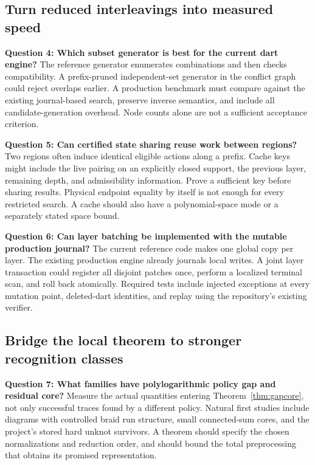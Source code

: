 \documentclass[11pt]{article}
\theoremstyle{definition}
\begin{document}
\subsection{Turn reduced interleavings into measured speed}

\textbf{Question 4: Which subset generator is best for the current dart
engine?} The reference generator enumerates combinations and then checks
compatibility. A prefix-pruned independent-set generator in the conflict
graph could reject overlaps earlier. A production benchmark must compare
against the existing journal-based search, preserve inverse semantics,
and include all candidate-generation overhead. Node counts alone are not
a sufficient acceptance criterion.

\textbf{Question 5: Can certified state sharing reuse work between
regions?} Two regions often induce identical eligible actions along a
prefix. Cache keys might include the live pairing on an explicitly
closed support, the previous layer, remaining depth, and admissibility
information. Prove a sufficient key before sharing results. Physical
endpoint equality by itself is not enough for every restricted search.
A cache should also have a polynomial-space mode or a separately stated
space bound.

\textbf{Question 6: Can layer batching be implemented with the mutable
production journal?} The current reference code makes one global copy
per layer. The existing production engine already journals local writes.
A joint layer transaction could register all disjoint patches once,
perform a localized terminal scan, and roll back atomically. Required
tests include injected exceptions at every mutation point, deleted-dart
identities, and replay using the repository's existing verifier.

\subsection{Bridge the local theorem to stronger recognition classes}

\textbf{Question 7: What families have polylogarithmic policy gap and
residual core?} Measure the actual quantities entering
Theorem~\ref{thm:gapcore}, not only successful traces found by a different
policy. Natural first studies include diagrams with controlled braid
run structure, small connected-sum cores, and the project's stored hard
unknot survivors. A theorem should specify the chosen normalizations and
reduction order, and should bound the total preprocessing that obtains
its promised representation.
\end{document}
